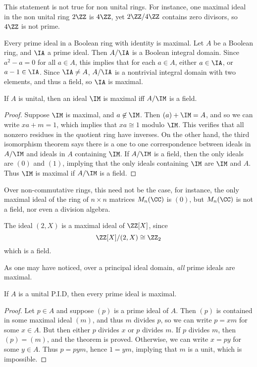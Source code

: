 \begin{remark}
    This statement is not true for non unital rings. For instance, one maximal ideal in the non unital ring $2 \ZZ$ is $4\ZZ$, yet $2\ZZ / 4\ZZ$ contains zero divisors, so $4\ZZ$ is not prime.
\end{remark}

\begin{example}
    Every prime ideal in a Boolean ring with identity is maximal. Let $A$ be a Boolean ring, and $\IA$ a prime ideal. Then $A/\IA$ is a Boolean integral domain. Since $a^2 - a = 0$ for all $a \in A$, this implies that for each $a \in A$, either $a \in \IA$, or $a - 1 \in \IA$. Since $\IA \neq A$, $A/\IA$ is a nontrivial integral domain with two elements, and thus a field, so $\IA$ is maximal.
\end{example}

\begin{theorem}
    If $A$ is unital, then an ideal $\IM$ is maximal iff $A/\IM$ is a field.
\end{theorem}
\begin{proof}
    Suppose $\IM$ is maximal, and $a \not \in \IM$. Then $(a) + \IM = A$, and so we can write $xa + m = 1$, which implies that $xa \cong 1$ modulo $\IM$. This verifies that all nonzero residues in the quotient ring have inverses. On the other hand, the third isomorphism theorem says there is a one to one correspondence between ideals in $A/\IM$ and ideals in $A$ containing $\IM$. If $A/\IM$ is a field, then the only ideals are $(0)$ and $(1)$, implying that the only ideals containing $\IM$ are $\IM$ and $A$. Thus $\IM$ is maximal if $A/\IM$ is a field.
\end{proof}

Over non-commutative rings, this need not be the case, for instance, the only maximal ideal of the ring of $n \times n$ matrices $M_n(\CC)$ is $(0)$, but $M_n(\CC)$ is not a field, nor even a division algebra.

\begin{example}
    The ideal $(2,X)$ is a maximal ideal of $\ZZ[X]$, since
    \[ \ZZ[X]/(2,X) \cong \ZZ_2 \]
    which is a field.
\end{example}

As one may have noticed, over a principal ideal domain, \emph{all} prime ideals are maximal.

\begin{theorem}
    If $A$ is a unital P.I.D, then every prime ideal is maximal.
\end{theorem}
\begin{proof}
    Let $p \in A$ and suppose $(p)$ is a prime ideal of $A$. Then $(p)$ is contained in some maximal ideal $(m)$, and thus $m$ divides $p$, so we can write $p = xm$ for some $x \in A$. But then either $p$ divides $x$ or $p$ divides $m$. If $p$ divides $m$, then $(p) = (m)$, and the theorem is proved. Otherwise, we can write $x = py$ for some $y \in A$. Thus $p = pym$, hence $1 = ym$, implying that $m$ is a unit, which is impossible.
\end{proof}

